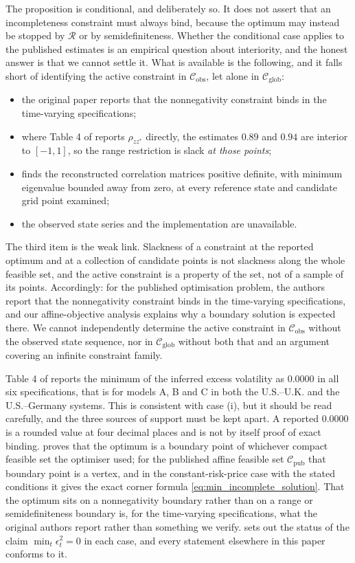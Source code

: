\documentclass[11pt]{article}
\theoremstyle{definition}
\begin{document}
The proposition is conditional, and deliberately so. It does not assert that an incompleteness constraint must always bind, because the optimum may instead be stopped by $\mathcal R$ or by semidefiniteness. Whether the conditional case applies to the published estimates is an empirical question about interiority, and the honest answer is that we cannot settle it. What is available is the following, and it falls short of identifying the active constraint in $\mathcal C_{\text{obs}}$, let alone in $\mathcal C_{\text{glob}}$:
\begin{itemize}
\item the original paper reports that the nonnegativity constraint binds in the time-varying specifications;
\item where Table 4 of \citet{BrandtSantaClara2002} reports $\rho_{zz^*}$ directly, the estimates $0.89$ and $0.94$ are interior to $[-1,1]$, so the range restriction is slack \emph{at those points};
\item {} finds the reconstructed correlation matrices positive definite, with minimum eigenvalue bounded away from zero, at every reference state and candidate grid point examined;
\item the observed state series and the implementation are unavailable.
\end{itemize}
The third item is the weak link. Slackness of a constraint at the reported optimum and at a collection of candidate points is not slackness along the whole feasible set, and the active constraint is a property of the set, not of a sample of its points. Accordingly: for the published optimisation problem, the authors report that the nonnegativity constraint binds in the time-varying specifications, and our affine-objective analysis explains why a boundary solution is expected there. We cannot independently determine the active constraint in $\mathcal C_{\text{obs}}$ without the observed state sequence, nor in $\mathcal C_{\text{glob}}$ without both that and an argument covering an infinite constraint family.

Table 4 of \citet{BrandtSantaClara2002} reports the minimum of the inferred excess volatility as $0.0000$ in all six specifications, that is for models A, B and C in both the U.S.--U.K. and the U.S.--Germany systems. This is consistent with case (i), but it should be read carefully, and the three sources of support must be kept apart. A reported $0.0000$ is a rounded value at four decimal places and is not by itself proof of exact binding.  proves that the optimum is a boundary point of whichever compact feasible set the optimiser used; for the published affine feasible set $\mathcal C_{\text{pub}}$ that boundary point is a vertex, and in the constant-risk-price case with the stated conditions it gives the exact corner formula \eqref{eq:min_incomplete_solution}. That the optimum sits on a nonnegativity boundary rather than on a range or semidefiniteness boundary is, for the time-varying specifications, what the original authors report rather than something we verify.  sets out the status of the claim $\min_t\epsilon_t^2=0$ in each case, and every statement elsewhere in this paper conforms to it.
\end{document}
